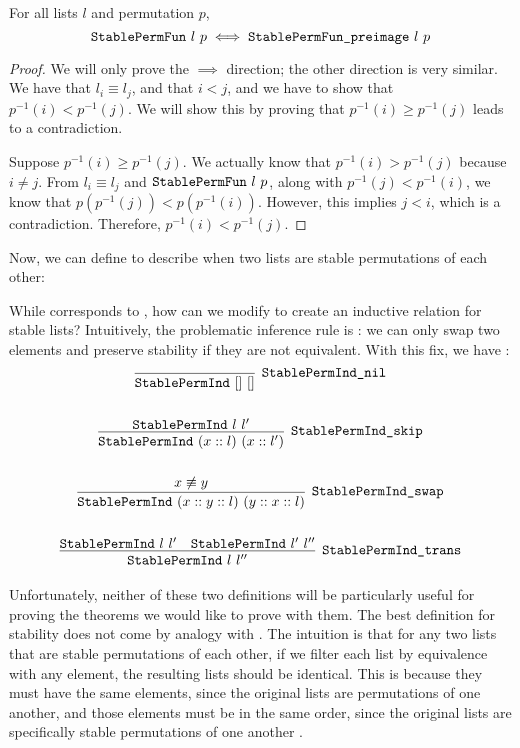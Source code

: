 \documentclass[sigplan,10pt,anonymous,review]{thesis}
\begin{document}
\begin{theorem}
  For all lists $l$ and permutation $p$,
  \begin{equation*}
    \texttt{\textup{StablePermFun}}~l~p \iff \texttt{\textup{StablePermFun\_preimage}}~l~p
  \end{equation*}
\end{theorem}
\begin{proof}
  We will only prove the $\implies$ direction; the other direction is
  very similar. We have that $l_i \equiv l_j$, and that $i < j$, and we
  have to show that $p^{-1}(i) < p^{-1}(j)$. We will show this by
  proving that $p^{-1}(i) \ge p^{-1}(j)$ leads to a contradiction.

  Suppose $p^{-1}(i) \ge p^{-1}(j)$. We actually know that $p^{-1}(i) >
  p^{-1}(j)$ because $i \neq j$. From $l_i \equiv l_j$ and
  $\texttt{\textup{StablePermFun}}~l~p$, along with $p^{-1}(j) < p^{-1}(i)$, we
  know that $p(p^{-1}(j)) < p(p^{-1}(i))$. However, this implies $j <
  i$, which is a contradiction. Therefore, $p^{-1}(i) < p^{-1}(j)$.
\end{proof}

Now, we can define  to describe when two lists are
stable permutations of each other:


While  corresponds to , how can
we modify  to create an inductive relation for stable
lists? Intuitively, the problematic inference rule is
: we can only swap two elements and preserve
stability if they are not equivalent. With this fix, we have :
\begin{gather*}
  \infer[\var{StablePermInd\_nil}]{\var{StablePermInd}~[]~[]}{}
  \\ \\
  \infer[\var{StablePermInd\_skip}]{\var{StablePermInd}~(x :: l)~(x :: l')}{%
    \var{StablePermInd}~l~l'
  }
  \\ \\
  \infer[\var{StablePermInd\_swap}]
        {\var{StablePermInd}~(x :: y :: l)~(y :: x :: l)}
        {x \not\equiv y}
  \\ \\
  \infer[\var{StablePermInd\_trans}]{\var{StablePermInd}~l~l''}{
    \var{StablePermInd}~l~l' & \var{StablePermInd}~l'~l''
  }
\end{gather*}

Unfortunately, neither of these two definitions will be particularly
useful for proving the theorems we would like to prove with them. The
best definition for stability does not come by analogy with
. The intuition is that for any two lists that are
stable permutations of each other, if we filter each list by
equivalence with any element, the resulting lists should be identical.
This is because they must have the same elements, since the original
lists are permutations of one another, and those elements must be in
the same order, since the original lists are specifically stable
permutations of one another \cite{leroy_2018}.

\end{document}
